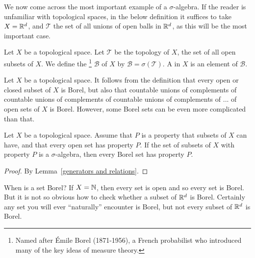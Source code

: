 \begin{subsec}
We now come across the most important example of a $\sigma$-algebra.
If the reader is unfamiliar with topological spaces, in the below definition it suffices to take $X = \mathbb{R}^d$, and $\mathcal T$ the set of all unions of open balls in $\mathbb{R}^d$, as this will be the most important case.
\end{subsec}

\begin{definition}
Let $X$ be a topological space.
Let $\mathcal T$ be the topology of $X$, the set of all open subsets of $X$.
We define the \footnote{Named after Émile Borel (1871-1956), a French probabilist who introduced many of the key ideas of measure theory.}
$\mathcal B$ of $X$ by $\mathcal B = \sigma(\mathcal T)$.
A  in $X$ is an element of $\mathcal B$.
\end{definition}

\begin{subsec}
Let $X$ be a topological space.
It follows from the definition that every open or closed subset of $X$ is Borel, but also that countable unions of complements of countable unions of complements of countable unions of complements of ... of open sets of $X$ is Borel.
However, some Borel sets can be even more complicated than that.
\end{subsec}

\begin{lemma}
Let $X$ be a topological space.
Assume that $P$ is a property that subsets of $X$ can have, and that every open set has property $P$.
If the set of subsets of $X$ with property $P$ is a $\sigma$-algebra, then every Borel set has property $P$.
\end{lemma}
\begin{proof}
By Lemma~\ref{generators and relations}.
\end{proof}

\begin{subsec}
When is a set Borel? If $X = \mathbb{N}$, then every set is open and so every set is Borel.
But it is not so obvious how to check whether a subset of $\mathbb{R}^d$ is Borel.
Certainly any set you will ever ``naturally'' encounter is Borel, but not every subset of $\mathbb{R}^d$ is Borel.
\end{subsec}

